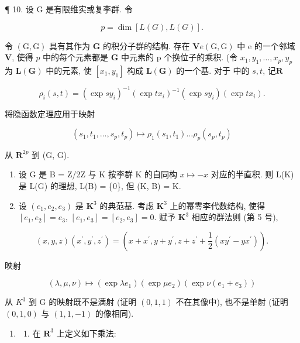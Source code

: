 ¶ 10. 设 G 是有限维实或复李群. 令

\[
p = \dim [ L (G), L (G) ].
\]

令 \((\mathrm{G},\mathrm{G})\) 具有其作为 \(\mathbf{G}\) 的积分子群的结构. 存在 \(\mathbf{V}\)\(e\)\((\mathrm{G},\mathrm{G})\) 中 e 的一个邻域 \(\mathbf{V}\), 使得 \(p\) 中的每个元素都是 \(\mathbf{G}\) 中元素的 p 个换位子的乘积. (令 \(x_{1},y_{1},\ldots ,x_{p},y_{p}\) 为 \(\mathbf{L}(\mathbf{G})\) 中的元素, 使 \([x_1,y_1]\) 构成 \(\mathbf{L}(\mathbf{G})\) 的一个基. 对于  中的 \(s,t\), 记\(\mathbf{R}\)

\[
\rho_ {i} (s, t) = (\exp s y _ {i}) ^ {- 1} (\exp t x _ {i}) ^ {- 1} (\exp s y _ {i}) (\exp t x _ {i}).
\]

将隐函数定理应用于映射

\[
\left(s _ {1}, t _ {1}, \dots , s _ {p}, t _ {p}\right) \mapsto \rho_ {1} \left(s _ {1}, t _ {1}\right) \dots \rho_ {p} \left(s _ {p}, t _ {p}\right)
\]

从 \(\mathbf{R}^{2p}\) 到 (G, G).

\begin{enumerate}
\def\labelenumi{\arabic{enumi}.}
\setcounter{enumi}{10}
\item
  设 G 是 B = Z/2Z 与 K 按李群 K 的自同构 \(x \mapsto -x\) 对应的半直积. 则 L(K) 是 L(G) 的理想, L(B) = \{0\}, 但 (K, B) = K.
\item
  设 \((e_1, e_2, e_3)\) 是 \(\mathbf{K}^3\) 的典范基. 考虑 \(\mathbf{K}^3\) 上的幂零李代数结构, 使得 \([e_1, e_2] = e_3\), \([e_1, e_3] = [e_2, e_3] = 0\). 赋予 \(\mathbf{K}^3\) 相应的群法则 (第 5 号),
\end{enumerate}

\[
(x, y, z) (x ^ {\prime}, y ^ {\prime}, z ^ {\prime}) = (x + x ^ {\prime}, y + y ^ {\prime}, z + z ^ {\prime} + \frac {1}{2} (x y ^ {\prime} - y x ^ {\prime})).
\]

映射

\[
(\lambda , \mu , \nu) \mapsto (\exp \lambda e _ {1}) (\exp \mu e _ {2}) (\exp \nu (e _ {1} + e _ {3}))
\]

从 \(K^{3}\) 到 G 的映射既不是满射 (证明 \((0,1,1)\) 不在其像中), 也不是单射 (证明 \((0,1,0)\) 与 \((1,1,-1)\) 的像相同).

\begin{enumerate}
\def\labelenumi{\arabic{enumi}.}
\setcounter{enumi}{12}
\tightlist
\item
  \begin{enumerate}
  \def\labelenumii{(\alph{enumii})}
  \tightlist
  \item
    在 \(\mathbf{R}^3\) 上定义如下乘法:
  \end{enumerate}
\end{enumerate}

